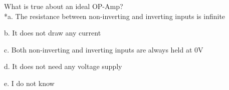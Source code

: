 
What is true about an ideal OP-Amp? \\

*a. The resistance between non-inverting and inverting inputs is infinite

b. It does not draw any current

c. Both non-inverting and inverting inputs are always held at 0V

d. It does not need any voltage supply

e. I do not know \\

